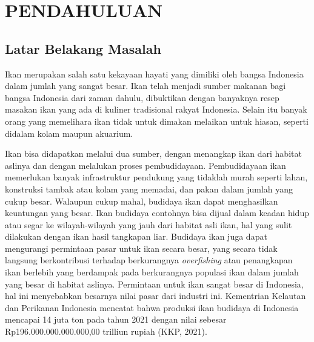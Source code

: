 
\chapter{PENDAHULUAN}

\section{Latar Belakang Masalah}

Ikan merupakan salah satu kekayaan hayati yang dimiliki oleh bangsa Indonesia 
dalam jumlah yang sangat besar. Ikan telah menjadi sumber makanan bagi bangsa 
Indonesia dari zaman dahulu, dibuktikan dengan banyaknya resep masakan ikan yang 
ada di kuliner tradisional rakyat Indonesia. Selain itu banyak orang yang 
memelihara ikan tidak untuk dimakan melaikan untuk hiasan, seperti didalam 
kolam maupun akuarium.

Ikan bisa didapatkan melalui dua sumber, dengan menangkap ikan dari habitat 
aslinya dan dengan melalukan proses pembudidayaan. Pembudidayaan ikan 
memerlukan banyak infrastruktur pendukung yang tidaklah murah seperti 
lahan, konstruksi tambak atau kolam yang memadai, dan pakan dalam jumlah 
yang cukup besar. Walaupun cukup mahal, budidaya ikan dapat 
menghasilkan keuntungan yang besar. Ikan budidaya contohnya bisa dijual 
dalam keadan hidup atau segar ke wilayah-wilayah yang jauh dari habitat asli ikan, 
hal yang sulit dilakukan dengan ikan hasil tangkapan liar. Budidaya ikan 
juga dapat mengurangi permintaan pasar untuk ikan secara besar, yang secara tidak 
langsung berkontribusi terhadap berkurangnya \textit{overfishing} atau penangkapan 
ikan berlebih yang berdampak pada berkurangnya populasi ikan dalam jumlah 
yang besar di habitat aslinya. Permintaan untuk ikan sangat besar di 
Indonesia, hal ini menyebabkan besarnya nilai pasar dari industri ini. 
Kementrian Kelautan dan Perikanan Indonesia mencatat bahwa 
produksi ikan budidaya di Indonesia mencapai 14 juta ton pada tahun 
2021 dengan nilai sebesar Rp196.000.000.000.000,00 trilliun rupiah (KKP, 2021).

